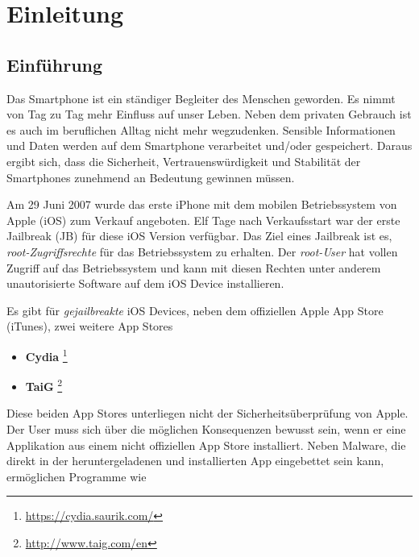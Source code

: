 %
%
%
% 


\chapter{Einleitung}
\label{ch:intro}


\section{Einführung}
\label{sec:Einführung}

Das Smartphone ist ein ständiger Begleiter des Menschen geworden. Es nimmt von Tag zu Tag mehr Einfluss auf unser Leben. Neben dem privaten Gebrauch ist es auch im beruflichen Alltag nicht mehr wegzudenken. Sensible Informationen und Daten werden auf dem Smartphone verarbeitet und/oder gespeichert. Daraus ergibt sich, dass die Sicherheit, Vertrauenswürdigkeit und Stabilität der Smartphones zunehmend an Bedeutung gewinnen müssen.\par 
Am 29 Juni 2007 wurde das erste iPhone mit dem mobilen Betriebssystem von Apple (iOS) zum Verkauf angeboten. Elf Tage nach Verkaufsstart war der erste Jailbreak (JB) für diese iOS Version verfügbar. Das Ziel eines Jailbreak ist es, \textit{\glqq root-Zugriffsrechte\grqq{}} für das Betriebssystem zu erhalten. Der \textit{\glqq root-User\grqq{}} hat vollen Zugriff auf das Betriebssystem und kann mit diesen Rechten unter anderem unautorisierte Software auf dem iOS Device installieren.\par 
Es gibt für \textit{\glqq gejailbreakte\grqq{}} iOS Devices, neben dem offiziellen Apple App Store (iTunes), zwei weitere App Stores
    \begin{itemize}
      	\item \textbf{Cydia} \footnote{\url{https://cydia.saurik.com/}}
		\item \textbf{TaiG} \footnote{\url{http://www.taig.com/en}}
    \end{itemize}
Diese beiden App Stores unterliegen nicht der Sicherheitsüberprüfung von Apple. Der User muss sich über die möglichen Konsequenzen bewusst sein, wenn er eine Applikation aus einem nicht offiziellen App Store installiert. Neben Malware, die direkt in der heruntergeladenen und installierten App eingebettet sein kann, ermöglichen Programme wie 

